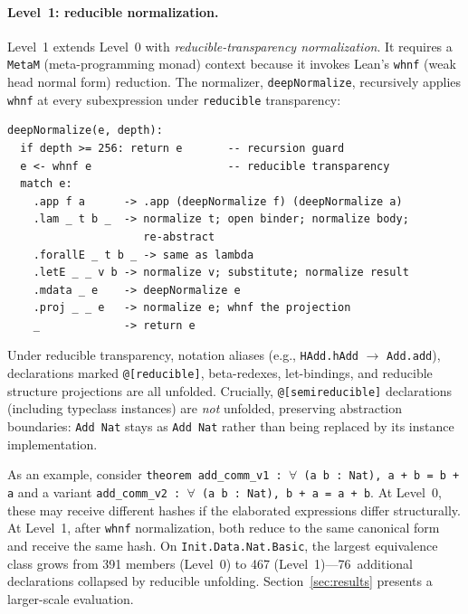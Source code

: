 \paragraph{Level~1: reducible normalization.}
Level~1 extends Level~0 with \emph{reducible-transparency
normalization}.  It requires a \texttt{MetaM} (meta-programming monad)
context because it invokes Lean's \texttt{whnf} (weak head normal form)
reduction.  The normalizer, \texttt{deepNormalize}, recursively applies
\texttt{whnf} at every subexpression under \texttt{reducible}
transparency:

\begin{lstlisting}[style=pseudo,caption={Deep normalization (simplified pseudocode)}]
deepNormalize(e, depth):
  if depth >= 256: return e       -- recursion guard
  e <- whnf e                     -- reducible transparency
  match e:
    .app f a      -> .app (deepNormalize f) (deepNormalize a)
    .lam _ t b _  -> normalize t; open binder; normalize body;
                     re-abstract
    .forallE _ t b _ -> same as lambda
    .letE _ _ v b -> normalize v; substitute; normalize result
    .mdata _ e    -> deepNormalize e
    .proj _ _ e   -> normalize e; whnf the projection
    _             -> return e
\end{lstlisting}

Under reducible transparency, notation aliases (e.g.,
\texttt{HAdd.hAdd} $\to$ \texttt{Add.add}), declarations marked
\texttt{@[reducible]}, beta-redexes, let-bindings, and reducible
structure projections are all unfolded.  Crucially,
\texttt{@[semireducible]} declarations (including typeclass instances)
are \emph{not} unfolded, preserving abstraction boundaries:
\texttt{Add Nat} stays as \texttt{Add Nat} rather than being replaced
by its instance implementation.

As an example, consider \texttt{theorem add\_comm\_v1 : $\forall$ (a b
: Nat), a + b = b + a} and a variant \texttt{add\_comm\_v2 :
$\forall$ (a b : Nat), b + a = a + b}.  At Level~0, these may receive
different hashes if the elaborated expressions differ structurally.  At
Level~1, after \texttt{whnf} normalization, both reduce to the same
canonical form and receive the same hash.  On
\texttt{Init.Data.Nat.Basic}, the largest equivalence class grows from
391 members (Level~0) to 467 (Level~1)---76~additional declarations
collapsed by reducible unfolding.  Section~\ref{sec:results} presents a
larger-scale evaluation.


